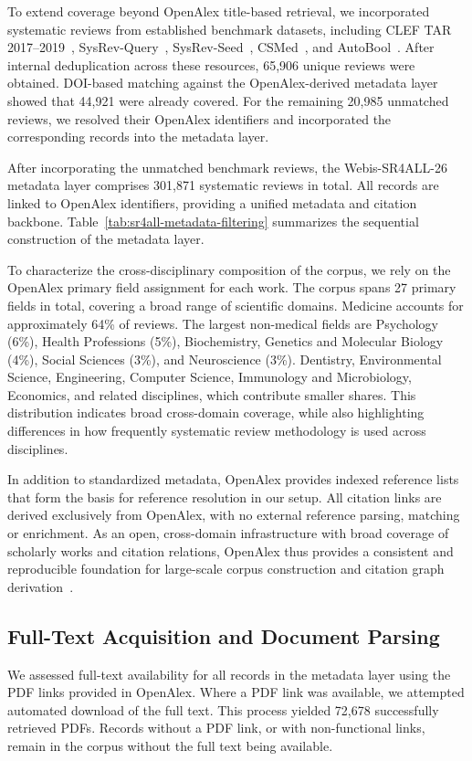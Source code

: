 To extend coverage beyond OpenAlex title-based retrieval, we incorporated systematic reviews from established benchmark datasets, including CLEF TAR 2017--2019~\cite{kanoulas:2017,kanoulas:2018,kanoulas:2019}, SysRev-Query~\cite{scells:2017}, SysRev-Seed~\cite{wang:2022}, CSMed~\cite{kusa:2023}, and AutoBool~\cite{wang:2025b}. After internal deduplication across these resources, 65,906 unique reviews were obtained. DOI-based matching against the OpenAlex-derived metadata layer showed that 44,921 were already covered. For the remaining 20,985 unmatched reviews, we resolved their OpenAlex identifiers and incorporated the corresponding records into the metadata layer. 

After incorporating the unmatched benchmark reviews, the Webis-SR4ALL-26 metadata layer comprises 301,871 systematic reviews in total. All records are linked to OpenAlex identifiers, providing a unified metadata and citation backbone. Table~\ref{tab:sr4all-metadata-filtering} summarizes the sequential construction of the metadata layer.

To characterize the cross-disciplinary composition of the corpus, we rely on the OpenAlex primary field assignment for each work. The corpus spans 27 primary fields in total, covering a broad range of scientific domains. Medicine accounts for approximately 64\% of reviews. The largest non-medical fields are Psychology (6\%), Health Professions (5\%), Biochemistry, Genetics and Molecular Biology (4\%), Social Sciences (3\%), and Neuroscience (3\%). Dentistry, Environmental Science, Engineering, Computer Science, Immunology and Microbiology, Economics, and related disciplines, which contribute smaller shares. This distribution indicates broad cross-domain coverage, while also highlighting differences in how frequently systematic review methodology is used across disciplines.

In addition to standardized metadata, OpenAlex provides indexed reference lists that form the basis for reference resolution in our setup. All citation links are derived exclusively from OpenAlex, with no external reference parsing, matching or enrichment. As an open, cross-domain infrastructure with broad coverage of scholarly works and citation relations, OpenAlex thus provides a consistent and reproducible foundation for large-scale corpus construction and citation graph derivation~\cite{culbert2025openalexrefcoverage}.



\subsection{Full-Text Acquisition and Document Parsing}
We assessed full-text availability for all records in the metadata layer using the PDF links provided in OpenAlex. Where a PDF link was available, we attempted automated download of the full text. This process yielded 72,678 successfully retrieved PDFs. Records without a PDF link, or with non-functional links, remain in the corpus without the full text being available.

